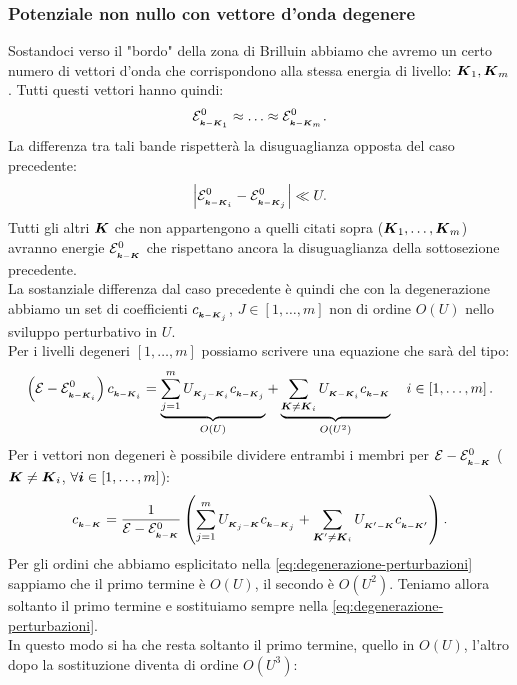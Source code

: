 \subsubsection{Potenziale non nullo con vettore d'onda degenere}
\label{subsubsec:Potenziale-non-nullo-con-vettore-dondadegenere}
Sostandoci verso il "bordo" della zona di Brilluin abbiamo che avremo un certo numero di vettori d'onda che corrispondono alla stessa energia di livello: $\boldsymbol{K}_1, \boldsymbol{K}_m$. Tutti questi vettori hanno quindi:
\[
	\mathcal{E}^0_{_{\boldsymbol{k}-\boldsymbol{K}_1}} \approx
	\ldots
	\approx
	\mathcal{E}^0_{_{\boldsymbol{k}-\boldsymbol{K}_m}}
.\] 
La differenza tra tali bande rispetterà la disuguaglianza opposta del caso precedente:
\[
	\left| \mathcal{E}^0_{_{\boldsymbol{k}-\boldsymbol{K}_i}} 
	-
	\mathcal{E}^0_{_{\boldsymbol{k}-\boldsymbol{K}_j}} \right| 
	\ll U
.\] 
Tutti gli altri $\boldsymbol{K}$ che non appartengono a quelli citati sopra ($\boldsymbol{K}_1, \ldots, \boldsymbol{K}_m$) avranno energie $\mathcal{E}^0_{_{\boldsymbol{k}-\boldsymbol{K}}}$ che rispettano ancora la disuguaglianza della sottosezione precedente.\\
La sostanziale differenza dal caso precedente è quindi che con la degenerazione abbiamo un set di coefficienti $c_{_{\boldsymbol{k}-\boldsymbol{K}_j}}$, $J \in [1,\ldots, m] $ non di ordine $O(U)$ nello sviluppo perturbativo in $U$. \\
Per i livelli degeneri $\left[ 1,\ldots,m \right] $ possiamo scrivere una equazione che sarà del tipo:
\[
	\left( \mathcal{E}  - \mathcal{E}^0_{_{\boldsymbol{k}-\boldsymbol{K}_i}} \right) 
	c_{_{\boldsymbol{k}-\boldsymbol{K}_i}} 
	=
	\underbrace{
	\sum_{j = 1}^{m} U_{_{\boldsymbol{K}_j-\boldsymbol{K}_i}}c_{_{\boldsymbol{k}-\boldsymbol{K}_j}}
	}_{O(U)}
	+
	\underbrace{
	\sum_{\boldsymbol{K} \neq \boldsymbol{K}_i}^{}
	U_{_{\boldsymbol{K}-\boldsymbol{K}_i}}c_{_{\boldsymbol{k}-\boldsymbol{K}}}
	}_{O(U^2)}
	\quad
	i \in \left[ 1,\ldots,m \right] 
	\label{eq:degenerazione-perturbazioni}
.\]
Per i vettori non degeneri è possibile dividere entrambi i membri per $\mathcal{E}-\mathcal{E}^0_{_{\boldsymbol{k}-\boldsymbol{K}}}$ ($\boldsymbol{K} \neq \boldsymbol{K}_i$, $\forall \boldsymbol{i} \in \left[ 1,\ldots,m \right] $):
\[
	c_{_{\boldsymbol{k}-\boldsymbol{K}}} =
	\frac{1}{\mathcal{E}-\mathcal{E}^0_{_{\boldsymbol{k}-\boldsymbol{K}}}}
	\left( \sum_{j=1}^{m} U_{_{\boldsymbol{K}_j-\boldsymbol{K}}}c_{_{\boldsymbol{k}-\boldsymbol{K}_j}} 
	+
	\sum_{\boldsymbol{K}' \neq \boldsymbol{K}_i}^{} U_{_{\boldsymbol{K}'-\boldsymbol{K}}}c_{_{\boldsymbol{k}-\boldsymbol{K}'}}	
	\right) 
.\] 
Per gli ordini che abbiamo esplicitato nella \ref{eq:degenerazione-perturbazioni} sappiamo che il primo termine è $O(U)$, il secondo è $O(U^2)$. Teniamo allora soltanto il primo termine e sostituiamo sempre nella \ref{eq:degenerazione-perturbazioni}. \\
In questo modo si ha che resta soltanto il primo termine, quello in $O(U)$, l'altro dopo la sostituzione diventa di ordine $O(U^3)$:
